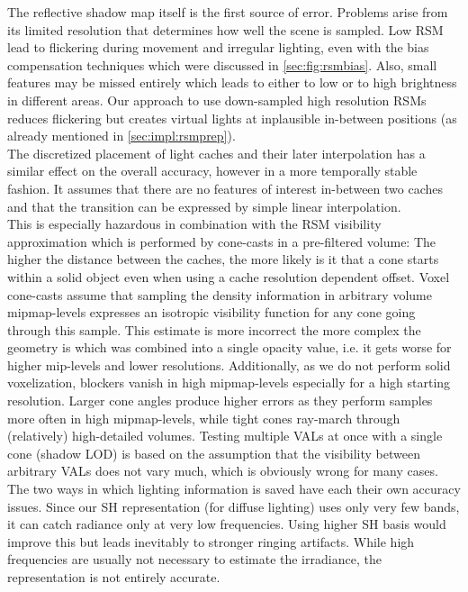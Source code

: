 \documentclass[thesis.tex]{subfiles}
\begin{document}
The reflective shadow map itself is the first source of error.
Problems arise from its limited resolution that determines how well the scene is sampled.
Low RSM lead to flickering during movement and irregular lighting, even with the bias compensation techniques which were discussed in \autoref{sec:fig:rsmbias}.
Also, small features may be missed entirely which leads to either to low or to high brightness in different areas.
Our approach to use down-sampled high resolution RSMs reduces flickering but creates virtual lights at inplausible in-between positions (as already mentioned in \autoref{sec:impl:rsmprep}).
\\
The discretized placement of light caches and their later interpolation has a similar effect on the overall accuracy, however in a more temporally stable fashion.
It assumes that there are no features of interest in-between two caches and that the transition can be expressed by simple linear interpolation.
\\
This is especially hazardous in combination with the RSM visibility approximation which is performed by cone-casts in a pre-filtered volume:
The higher the distance between the caches, the more likely is it that a cone starts within a solid object even when using a cache resolution dependent offset.
Voxel cone-casts assume that sampling the density information in arbitrary volume mipmap-levels expresses an isotropic visibility function for any cone going through this sample.
This estimate is more incorrect the more complex the geometry is which was combined into a single opacity value, i.e. it gets worse for higher mip-levels and lower resolutions.
Additionally, as we do not perform solid voxelization, blockers vanish in high mipmap-levels especially for a high starting resolution.
Larger cone angles produce higher errors as they perform samples more often in high mipmap-levels, while tight cones ray-march through (relatively) high-detailed volumes.
Testing multiple VALs at once with a single cone (shadow LOD) is based on the assumption that the visibility between arbitrary VALs does not vary much, which is obviously wrong for many cases.
\\
The two ways in which lighting information is saved have each their own accuracy issues.
Since our SH representation (for diffuse lighting) uses only very few bands, it can catch radiance only at very low frequencies.
Using higher SH basis would improve this but leads inevitably to stronger ringing artifacts.
While high frequencies are usually not necessary to estimate the irradiance, the representation is not entirely accurate.
\end{document}
